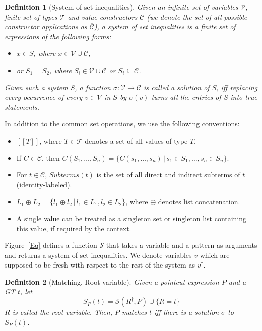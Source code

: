 \documentclass{IOS-Book-Article}     %
\newcommand{\sem}[1]{[\![#1]\!]}
\newcommand{\fresh}[1]{#1^\dagger}
\newcommand{\Eq}{\mathcal{S}}
\newtheorem{Def}{Definition}
\newcommand{\figref}[1]{Figure~\ref{#1}}
\begin{document}
\begin{Def}[System of set inequalities]
Given an infinite set of variables $\mathcal{V}$, finite set of types $\mathcal{T}$ and value constructors $\mathcal{C}$ (we denote the set of all possible constructor applications as $\overline{\mathcal{C}}$),
a \emph{system of set inequalities} is a finite set of expressions of the following forms:
\begin{itemize}
\item $x \in S$, where $x \in \mathcal{V} \cup \overline{\mathcal{C}}$, 
\item or $S_1 = S_2$, where $S_i \in \mathcal{V} \cup \overline{\mathcal{C}}$ or $S_i \subseteq \overline{\mathcal{C}}$.
\end{itemize}
Given such a system $S$, a function $\sigma : \mathcal{V}  \rightarrow \overline{\mathcal{C}}$ is called a \emph{solution} of $S$, iff replacing every occurrence of every $v \in \mathcal{V}$ in $S$ by $\sigma(v)$ turns all the entries of $S$ into true statements.
\end{Def}
In addition to the common set operations, we use the following conventions:
\begin{itemize}
	\item $\sem{T}$, where $T \in \mathcal{T}$ denotes a set of all values of type $T$.
	\item If $C \in \mathcal{C}$, then $C(S_1, \ldots, S_n) = \{C(s_1, \ldots, s_n) \,|\, s_1 \in S_1, \ldots, s_n \in S_n\}$.
	\item For $t \in \overline{\mathcal{C}}$, $Subterms(t)$ is the set of all direct and indirect subterms of $t$ (identity-labeled).
	\item $L_1 \oplus L_2 = \{l_1 \oplus l_2 \,|\, l_1 \in L_1, l_2 \in L_2\}$, where $\oplus$ denotes list concatenation.
	\item A single value can be treated as a singleton set or singleton list containing this value, if required by the context.
\end{itemize}

\figref{Eq} defines a function $\Eq{}$ that takes a variable and a pattern as arguments and returns a system of set inequalities. We denote variables $v$ which are supposed to be fresh with respect to the rest of the system as $\fresh{v}$. 
\begin{Def}[Matching, Root variable]\label{SPT}
Given a pointcut expression $P$ and a GT $t$, let 
$$S_P(t) = \Eq{}(\fresh{R}, P) \cup \{R = t\}$$
$R$ is called the \emph{root variable}. Then, $P$ \emph{matches} $t$ iff there is a solution $\sigma$ to $S_P(t)$.
\end{Def}
\end{document}

